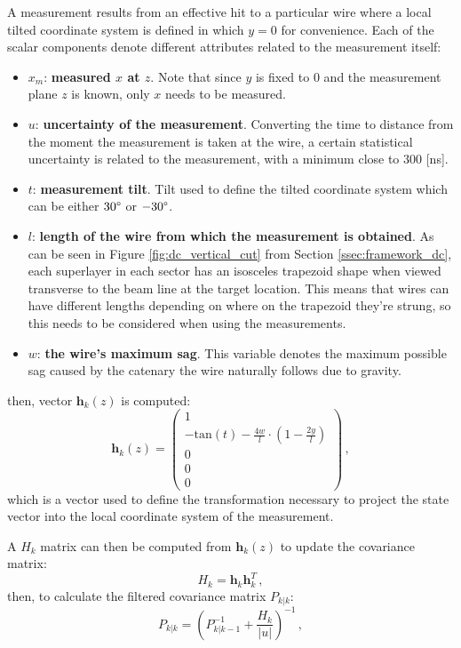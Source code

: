 A measurement results from an effective hit to a particular wire where a local tilted coordinate system is defined in which $y=0$ for convenience.
Each of the scalar components denote different attributes related to the measurement itself:
    \begin{itemize}
        \item $x_m$: \textbf{measured $x$ at $z$}.
        Note that since $y$ is fixed to $0$ and the measurement plane $z$ is known, only $x$ needs to be measured.
        \item $u$: \textbf{uncertainty of the measurement}.
        Converting the time to distance from the moment the measurement is taken at the wire, a certain statistical uncertainty is related to the measurement, with a minimum close to $300$ [ns].
        \item $t$: \textbf{measurement tilt}.
        Tilt used to define the tilted coordinate system which can be either $30\degree$ or $-30\degree$.
        \item $l$: \textbf{length of the wire from which the measurement is obtained}.
        As can be seen in Figure \ref{fig:dc_vertical_cut} from Section \ref{ssec:framework_dc}, each superlayer in each sector has an isosceles trapezoid shape when viewed transverse to the beam line at the target location.
        This means that wires can have different lengths depending on where on the trapezoid they're strung, so this needs to be considered when using the measurements.
        \item $w$: \textbf{the wire's maximum sag}.
        This variable denotes the maximum possible sag caused by the catenary the wire naturally follows due to gravity.
    \end{itemize}
then, vector $\mathbf{h}_k(z)$ is computed:
    \begin{equation} \label{eq:framework_tf_h}
        \mathbf{h}_k(z) = \begin{pmatrix}1\\ -\text{tan}(t) - \frac{4w}{l} \cdot (1 - \frac{2y}{l})\\ 0\\ 0\\ 0\end{pmatrix}\,,
    \end{equation}
which is a vector used to define the transformation necessary to project the state vector into the local coordinate system of the measurement.

A $H_k$ matrix can then be computed from $\mathbf{h}_k(z)$ to update the covariance matrix:
    \begin{equation*}
        H_k = \mathbf{h}_k \mathbf{h}_k^T\,,
    \end{equation*}
then, to calculate the filtered covariance matrix $P_{k|k}$:
    \begin{equation*}
        P_{k|k} = \left( P_{k|k-1}^{-1} + \frac{H_k}{|u|} \right)^{-1}\,,
    \end{equation*}

